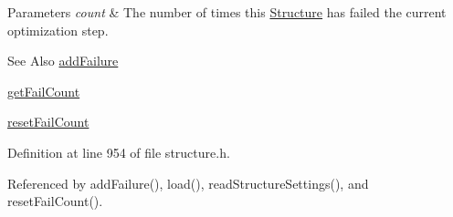 \begin{DoxyParams}{Parameters}
{\em count} & The number of times this \hyperlink{classGlobalSearch_1_1Structure}{Structure} has failed the current optimization step. \\
\hline
\end{DoxyParams}
\begin{DoxySeeAlso}{See Also}
\hyperlink{classGlobalSearch_1_1Structure_ab1ea99315ad11fc88f0941069f169f1a}{add\-Failure} 

\hyperlink{classGlobalSearch_1_1Structure_a39a044521e91f117be11fcf9a1a562b3}{get\-Fail\-Count} 

\hyperlink{classGlobalSearch_1_1Structure_a27532f25313083bea490b3b6fa84c743}{reset\-Fail\-Count} 
\end{DoxySeeAlso}


Definition at line 954 of file structure.\-h.



Referenced by add\-Failure(), load(), read\-Structure\-Settings(), and reset\-Fail\-Count().

